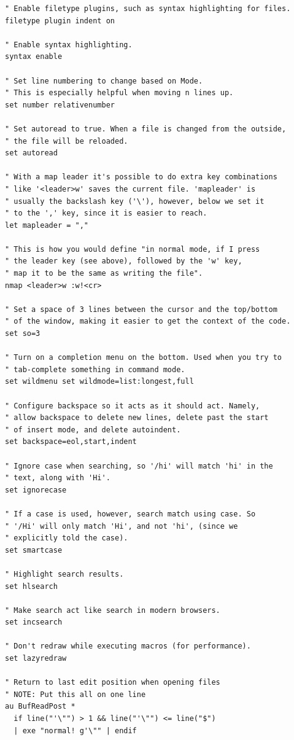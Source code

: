 \documentclass[11pt]{article}
\begin{document}
\begin{verbatim}
" Enable filetype plugins, such as syntax highlighting for files. 
filetype plugin indent on

" Enable syntax highlighting. 
syntax enable

" Set line numbering to change based on Mode.
" This is especially helpful when moving n lines up.
set number relativenumber

" Set autoread to true. When a file is changed from the outside, 
" the file will be reloaded. 
set autoread

" With a map leader it's possible to do extra key combinations 
" like '<leader>w' saves the current file. 'mapleader' is 
" usually the backslash key ('\'), however, below we set it 
" to the ',' key, since it is easier to reach.
let mapleader = ","

" This is how you would define "in normal mode, if I press 
" the leader key (see above), followed by the 'w' key, 
" map it to be the same as writing the file".
nmap <leader>w :w!<cr>

" Set a space of 3 lines between the cursor and the top/bottom 
" of the window, making it easier to get the context of the code. 
set so=3

" Turn on a completion menu on the bottom. Used when you try to 
" tab-complete something in command mode. 
set wildmenu set wildmode=list:longest,full

" Configure backspace so it acts as it should act. Namely, 
" allow backspace to delete new lines, delete past the start 
" of insert mode, and delete autoindent.
set backspace=eol,start,indent

" Ignore case when searching, so '/hi' will match 'hi' in the 
" text, along with 'Hi'. 
set ignorecase

" If a case is used, however, search match using case. So 
" '/Hi' will only match 'Hi', and not 'hi', (since we 
" explicitly told the case). 
set smartcase

" Highlight search results. 
set hlsearch

" Make search act like search in modern browsers. 
set incsearch

" Don't redraw while executing macros (for performance). 
set lazyredraw

" Return to last edit position when opening files 
" NOTE: Put this all on one line 
au BufReadPost * 
  if line("'\"") > 1 && line("'\"") <= line("$") 
  | exe "normal! g'\"" | endif
\end{verbatim}
\end{document}
